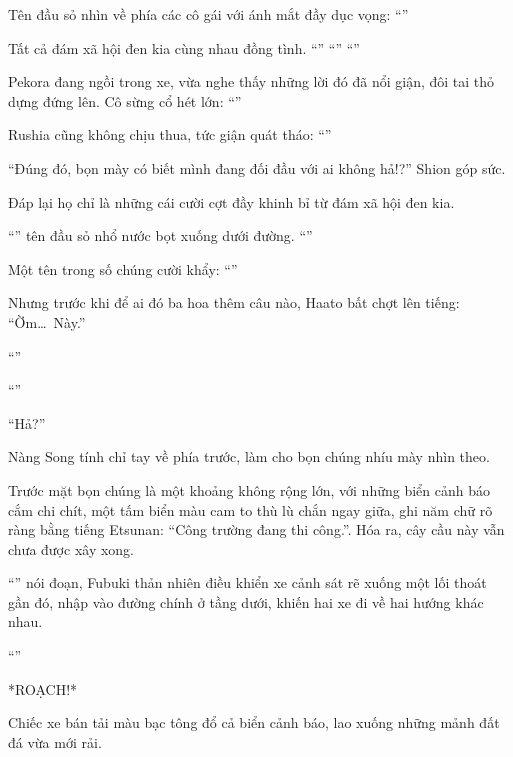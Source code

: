 \documentclass[../main.tex]{subfiles}
\begin{document}
Tên đầu sỏ nhìn về phía các cô gái với ánh mắt đầy dục vọng: ``''

Tất cả đám xã hội đen kia cùng nhau đồng tình. ``'' ``'' ``''

Pekora đang ngồi trong xe, vừa nghe thấy những lời đó đã nổi giận, đôi tai thỏ dựng đứng lên. Cô sừng cổ hét lớn: ``''

Rushia cũng không chịu thua, tức giận quát tháo: ``''

``Đúng đó, bọn mày có biết mình đang đối đầu với ai không hả!?'' Shion góp sức.

Đáp lại họ chỉ là những cái cười cợt đầy khinh bỉ từ đám xã hội đen kia.

``'' tên đầu sỏ nhổ nước bọt xuống dưới đường. ``''

Một tên trong số chúng cười khẩy: ``''

Nhưng trước khi để ai đó ba hoa thêm câu nào, Haato bất chợt lên tiếng: ``Ờm\dots\ Này.''

``''

``''

``Hả?''

Nàng Song tính chỉ tay về phía trước, làm cho bọn chúng nhíu mày nhìn theo.

Trước mặt bọn chúng là một khoảng không rộng lớn, với những biển cảnh báo cắm chi chít, một tấm biển màu cam to thù lù chắn ngay giữa, ghi năm chữ rõ ràng bằng tiếng Etsunan: ``Công trường đang thi công.''. Hóa ra, cây cầu này vẫn chưa được xây xong.

``'' nói đoạn, Fubuki thản nhiên điều khiển xe cảnh sát rẽ xuống một lối thoát gần đó, nhập vào đường chính ở tầng dưới, khiến hai xe đi về hai hướng khác nhau.

``''

*ROẠCH!*

Chiếc xe bán tải màu bạc tông đổ cả biển cảnh báo, lao xuống những mảnh đất đá vừa mới rải.
\end{document}
